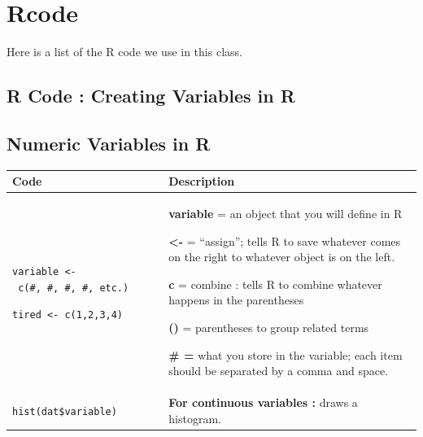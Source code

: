\documentclass[
  letterpaper,
  DIV=11,
  numbers=noendperiod,
  oneside]{scrreprt}
\begin{document}
\cleardoublepage
{}
{}
\appendix

\chapter{Rcode}\label{rcode}

Here is a list of the R code we use in this class.

\section{R Code : Creating Variables in
R}\label{r-code-creating-variables-in-r}

\section{Numeric Variables in R}\label{numeric-variables-in-r}

\begin{longtable}[]{@{}
  >{\raggedright\arraybackslash}p{}
  >{\raggedright\arraybackslash}p{}@{}}
\toprule\noalign{}
\begin{minipage}[b]{\linewidth}\raggedright
Code
\end{minipage} & \begin{minipage}[b]{\linewidth}\raggedright
Description
\end{minipage} \\
\midrule\noalign{}
\endhead
\bottomrule\noalign{}
\endlastfoot
\texttt{variable\ \textless{}-\ c(\#,\ \#,\ \#,\ \#,\ etc.)}

\texttt{tired\ \textless{}-\ c(1,2,3,4)} & \textbf{variable} = an object
that you will define in R

\textbf{\textless-} = ``assign''; tells R to save whatever comes on the
right to whatever object is on the left.

\textbf{c} = combine : tells R to combine whatever happens in the
parentheses

\textbf{()} = parentheses to group related terms

\textbf{\# =} what you store in the variable; each item should be
separated by a comma and space. \\
\texttt{hist(dat\$variable)} & \textbf{For continuous variables :} draws
a histogram. \\
\end{longtable}
\end{document}
